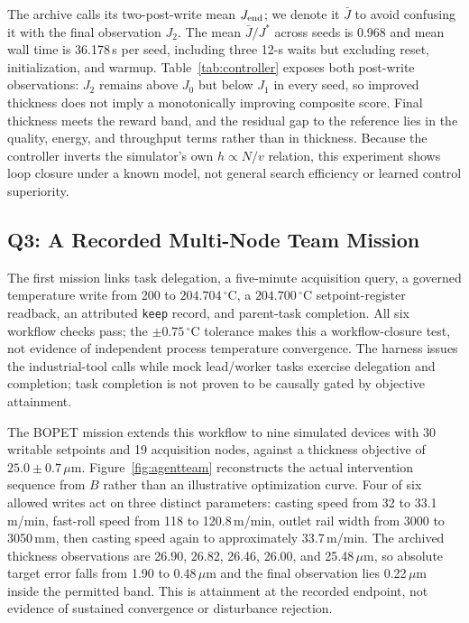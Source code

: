 The archive calls its two-post-write mean $J_{\rm end}$; we denote it
$\bar{J}$ to avoid confusing it with the final observation $J_2$.
The mean $\bar{J}/J^*$ across seeds is 0.968 and mean wall time is
36.178\,s per seed, including three 12-s waits but excluding reset,
initialization, and warmup. Table~\ref{tab:controller} exposes both post-write
observations: $J_2$ remains above $J_0$ but below $J_1$ in every seed, so
improved thickness does not imply a monotonically improving composite score. Final thickness meets the reward band, and the
residual gap to the reference lies in the quality, energy, and throughput
terms rather than in thickness. Because the controller inverts the simulator's
own $h\propto N/v$ relation, this experiment shows loop closure under a known
model, not general search efficiency or learned control superiority.

\subsection{Q3: A Recorded Multi-Node Team Mission}
\label{sec:agentloop}
The first mission links task delegation, a five-minute acquisition query, a
governed temperature write from 200 to $204.704\,^\circ$C, a
$204.700\,^\circ$C setpoint-register readback, an attributed \texttt{keep} record, and
parent-task completion. All six workflow checks pass; the $\pm0.75\,^\circ$C tolerance
makes this a workflow-closure test, not evidence of independent process
temperature convergence. The harness issues the industrial-tool calls while
mock lead/worker tasks exercise delegation and completion; task completion
is not proven to be causally gated by objective attainment.

The BOPET mission extends this workflow to nine simulated devices with 30
writable setpoints and 19 acquisition nodes, against a thickness objective of
$25.0\pm0.7\,\mu$m. Figure~\ref{fig:agentteam} reconstructs the actual
intervention sequence from $B$ rather than an illustrative optimization curve.
Four of six allowed writes act on three distinct parameters: casting speed
from 32 to 33.1\,m/min, fast-roll speed from 118 to 120.8\,m/min, outlet rail
width from 3000 to 3050\,mm, then casting speed again to approximately
33.7\,m/min. The archived thickness observations are 26.90, 26.82, 26.46,
26.00, and 25.48\,$\mu$m, so absolute target error falls from 1.90 to 0.48\,$\mu$m
and the final observation lies 0.22\,$\mu$m inside the permitted band.
This is attainment at the recorded endpoint, not evidence of sustained
convergence or disturbance rejection.

